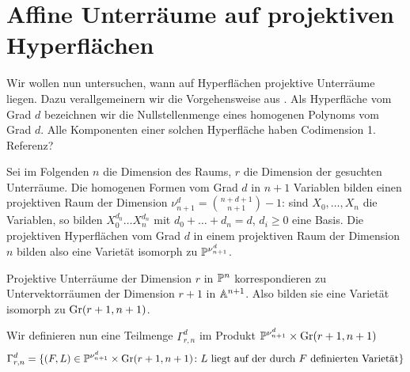 \section{Affine Unterräume auf projektiven Hyperflächen} \label{sec:linesproj}
Wir wollen nun untersuchen, wann auf Hyperflächen projektive Unterräume liegen. Dazu verallgemeinern wir die Vorgehensweise aus \cite[S.~78ff]{Shafarevich}. Als Hyperfläche vom Grad $d$ bezeichnen wir die Nullstellenmenge eines homogenen Polynoms vom Grad $d$. Alle Komponenten einer solchen Hyperfläche haben Codimension 1. \note Referenz?

Sei im Folgenden $n$ die Dimension des Raums, $r$ die Dimension der gesuchten Unterräume. Die homogenen Formen vom Grad $d$ in $n+1$ Variablen bilden einen projektiven Raum der Dimension $\nu_{n+1}^d = \binom{n+d+1}{n+1} - 1$: sind $X_0, \dots, X_n$ die Variablen, so bilden $X_0^{d_0} \dots X_n^{d_n}$ mit $d_0 + \dots + d_n = d$, $d_i \geq 0$ eine Basis. Die projektiven Hyperflächen vom Grad $d$ in einem projektiven Raum der Dimension $n$ bilden also eine Varietät isomorph zu $\mathbb P^{\nu_{n+1}^d}$.

Projektive Unterräume der Dimension $r$ in $\mathbb P^{n}$ korrespondieren zu Untervektorräumen der Dimension $r+1$ in $\mathbb A^{n+1}$. Also bilden sie eine Varietät isomorph zu $\grass r+1/{n+1}$.

Wir definieren nun eine Teilmenge $\Gamma_{r,n}^d$ im Produkt $\proj{\nu_{n+1}^d} \times \grass r+1/{n+1}$
\begin{equation}
\Gamma_{r,n}^d = \{(F,L) \in \mathbb P^{\nu_{n+1}^d} \times \grass r+1/{n+1} \colon \text{$L$ liegt auf der durch $F$ definierten Varietät} \}
\end{equation}

